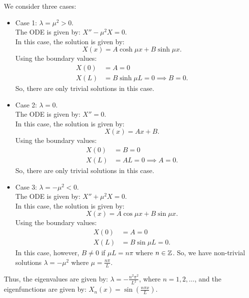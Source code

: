 We consider three cases:
\begin{itemize}
	\item Case 1: $\lambda = \mu^2 > 0$.\\
	The ODE is given by: $X'' - \mu^2X = 0$.\\
	In this case, the solution is given by:
	\[
	X(x) = A \cosh{\mu x} + B \sinh{\mu x}.
	\]
	Using the boundary values:
	\begin{align*}
		X(0) &= A = 0 \\
		X(L) &= B \sinh{\mu L} = 0 \implies B=0.
	\end{align*}
	So, there are only trivial solutions in this case.
	
	\item Case 2: $\lambda = 0$.\\
	The ODE is given by: $X''= 0$.\\
	In this case, the solution is given by:
	\[
	X(x) = Ax + B.
	\]
	Using the boundary values:
	\begin{align*}
		X(0) &= B = 0 \\
		X(L) &= AL = 0 \implies A = 0.
	\end{align*}
	So, there are only trivial solutions in this case.
	
	\item Case 3: $\lambda = -\mu^2 < 0$.\\
	The ODE is given by: $X'' + \mu^2 X = 0$.\\
	In this case, the solution is given by:
	\[
	X(x) = A \cos{\mu x} + B \sin{\mu x}.
	\]
	Using the boundary values:
	\begin{align*}
		X(0) &= A = 0 \\
		X(L) &= B \sin{\mu L} = 0.
	\end{align*}
	In this case, however, $B \neq 0$ if $\mu L = n \pi$ where $n \in \mathbb{Z}$. So, we have non-trivial solutions $\lambda = -\mu^2$ where $\mu = \frac{n \pi}{L}$.
\end{itemize}
Thus, the eigenvalues are given by: $\lambda = -\frac{n^2\pi^2}{L^2}$, where $n = 1, 2, \dots$, and the eigenfunctions are given by: $X_n(x) = \sin\left(\frac{n\pi x}{L}\right)$.

